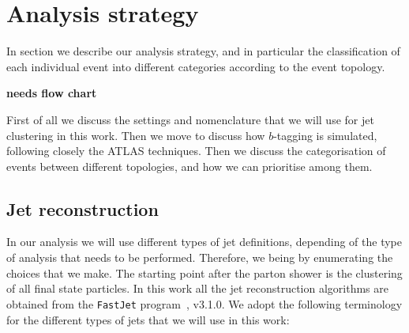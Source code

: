 
\section{Analysis strategy}
\label{sec:analysis}


In section we describe our analysis strategy, and in particular
the classification of each individual event into
different categories according to the event topology.

{\bf needs flow chart}

First of all we discuss the settings and nomenclature that
we will use for jet clustering in this work.
%
Then we move to discuss how $b$-tagging is simulated,
following closely the ATLAS techniques.
%
Then we discuss the categorisation of events between different
topologies, and how we can prioritise among them.


\subsection{Jet reconstruction}

In our analysis we will use different types of jet definitions,
depending of the type of analysis that needs to be performed.
%
Therefore, we being by enumerating the choices that we make.
%
The starting point after the parton shower is the clustering
of all final state particles.
%
In this work all the jet reconstruction algorithms
are obtained from the {\tt FastJet} program~\cite{Cacciari:2011ma},
v3.1.0.
%
We adopt the following terminology for the different types of jets
that we will use in this work:

